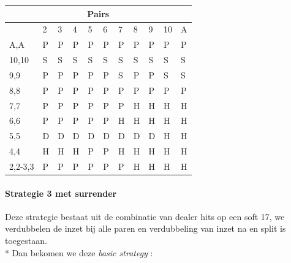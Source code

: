 \documentclass[conference]{IEEEtran}
\begin{document}
\begin{table}[ht]
\begin{tabular}{|l|l|l|l|l|l|l|l|l|l|l|}
\multicolumn{11}{|c|}{\textbf{Pairs}}                                 \\ \hline
                             & 2 & 3 & 4 & 5 & 6 & 7 & 8 & 9 & 10 & A \\ \hline
A,A                          & P & P & P & P & P & P & P & P & P & P  \\ \hline
10,10                        & S & S & S & S & S & S & S & S & S & S  \\ \hline
9,9                          & P & P & P & P & P & S & P & P & S & S  \\ \hline
8,8                          & P & P & P & P & P & P & P & P & P & P  \\ \hline
7,7                          & P & P & P & P & P & P & H & H & H & H  \\ \hline
6,6                          & P & P & P & P & P & H & H & H & H & H  \\ \hline
5,5                          & D & D & D & D & D & D & D & D & H & H  \\ \hline
4,4                          & H & H & H & P & P & H & H & H & H & H  \\ \hline
2,2-3,3                      & P & P & P & P & P & P & H & H & H & H  \\ \hline
\end{tabular}
\end{table}

\newpage

\paragraph{Strategie 3 met surrender}

Deze strategie bestaat uit de combinatie van dealer hits op een soft 17, we verdubbelen de inzet bij alle paren en verdubbeling van inzet na en split is toegestaan.\\*
Dan bekomen we deze \textit{basic strategy} :
\end{document}
